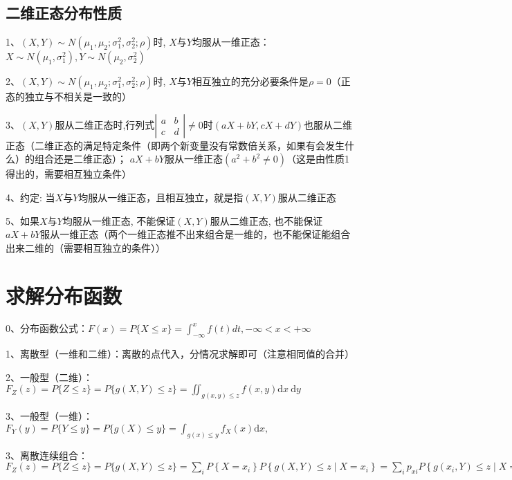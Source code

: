 \subsection{二维正态分布性质}

1、$\left(X, Y\right) \sim N\left(\mu_{1}, \mu_{2} ; \sigma_{1}^{2}, \sigma_{2}^{2} ; \rho\right)$时, $X$与$Y$均服从一维正态：$X \sim{N}\left(\mu_{1}, \sigma_{1}^{2}\right), Y \sim N\left(\mu_{2}, \sigma_{2}^{2}\right)$

2、$(X, Y) \sim N\left(\mu_{1}, \mu_{2} ; \sigma_{1}^{2}, \sigma_{2}^{2} ; \rho\right)$时, $X$与$Y$相互独立的充分必要条件是$\rho=0$（正态的独立与不相关是一致的）

3、$(X, Y)$服从二维正态时,行列式$\left|\begin{array}{ll}a & b \\ c & d\end{array}\right| \neq 0$时$(a X+b Y, c X+d Y)$也服从二维正态（二维正态的满足特定条件（即两个新变量没有常数倍关系，如果有会发生什么）的组合还是二维正态）； $ a X+b Y$服从一维正态$\left(a^{2}+b^{2} \neq 0\right)$（这是由性质1得出的，需要相互独立条件）

4、约定: 当$X$与$Y$均服从一维正态，且相互独立，就是指$(X, Y)$服从二维正态

5、如果$X$与$Y$均服从一维正态, 不能保证$(X, Y)$服从二维正态, 也不能保证$a X+b Y$服从一维正态（两个一维正态推不出来组合是一维的，也不能保证能组合出来二维的（需要相互独立的条件））

\section{求解分布函数}

0、分布函数公式：$F(x) = P\{ X \le x\}=\int_{-\infty}^xf(t)dt,-\infty <x<+\infty$

1、离散型（一维和二维）：离散的点代入，分情况求解即可（注意相同值的合并）

2、一般型（二维）：$F_{Z}(z)=P\{Z \leqslant z\}=P\{g(X, Y) \leqslant z\}=\iint_{g(x, y) \leqslant z} f(x, y) \mathrm{d} x \mathrm{~d} y$

3、一般型（一维）：$F_{Y}(y)=P\{Y \leqslant y\}=P\{g(X) \leqslant y\}=\int_{g(x) \leqslant y} f_{X}(x) \mathrm{d} x, $

3、离散连续组合：$F_{Z}(z)=P\{Z \leqslant z\}=P\{g(X, Y) \leqslant z\} =\sum_{i} P\left\{X=x_{i}\right\} P\left\{g(X, Y) \leqslant z \mid X=x_{i}\right\}=\sum_{i} p_{xi} P\left\{g\left(x_{i}, Y\right) \leqslant z \mid X=x_{i}\right\}$

